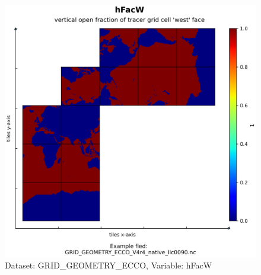 \begin{figure}[H]
\centering
\includegraphics[scale=0.55]{../images/plots/native_plots_coords/Geometry_Parameters_for_the_Lat-Lon-Cap_90_(llc90)_Native_Model_Grid_(Version_4_Release_4)/hFacW.png}
\caption{Dataset: GRID\_GEOMETRY\_ECCO, Variable: hFacW}
\label{tab:table-GRID_GEOMETRY_ECCO_hFacW-Plot}
\end{figure}
\pagebreak
